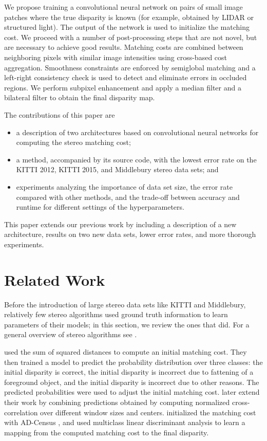 \documentclass[twoside,11pt]{article}
\begin{document}
We propose training a convolutional neural network \citep{lecun1998gradient} on
pairs of small image patches where the true disparity is known (for example,
obtained by LIDAR or structured light). The output of the network is used to
initialize the matching cost. We proceed with a number of post-processing steps
that are not novel, but are necessary to achieve good results. Matching costs
are combined between neighboring pixels with similar image intensities using
cross-based cost aggregation. Smoothness constraints are enforced by semiglobal
matching and a left-right consistency check is used to detect and eliminate
errors in occluded regions. We perform subpixel enhancement and apply a median
filter and a bilateral filter to obtain the final disparity map. 

The contributions of this paper are
%
\begin{itemize} 
\setlength{\itemsep}{1pt}
\item a description of two architectures based on convolutional neural
networks for computing the stereo matching cost;

\item a method, accompanied by its source code, with the lowest error rate on
the KITTI 2012, KITTI 2015, and Middlebury stereo data sets; and

\item experiments analyzing the importance of data set size, the error rate
compared with other methods, and the trade-off between accuracy and runtime for
different settings of the hyperparameters.

\end{itemize}

This paper extends our previous work \citep{Zbontar_2015_CVPR} by including
a description of a new architecture, results on two new data sets,
lower error rates, and more thorough experiments.

\section{Related Work}

Before the introduction of large stereo data sets like KITTI and Middlebury,
relatively few stereo algorithms used ground truth information to learn
parameters of their models; in this section, we review the ones that did. For a
general overview of stereo algorithms see \citet{scharstein2002taxonomy}.

\citet{kong2004method} used the sum of squared distances to compute an initial
matching cost. They then trained a model to predict the probability distribution
over three classes: the initial disparity is correct, the initial disparity is
incorrect due to fattening of a foreground object, and the initial disparity is
incorrect due to other reasons. The predicted probabilities were used to adjust
the initial matching cost. \citet{kong2006stereo} later extend their work by
combining predictions obtained by computing normalized cross-correlation over
different window sizes and centers.  \citet{peris2012towards} initialized the
matching cost with AD-Census \citep{mei2011building}, and used multiclass
linear discriminant analysis to learn a mapping from the computed matching cost
to the final disparity.
\end{document}
